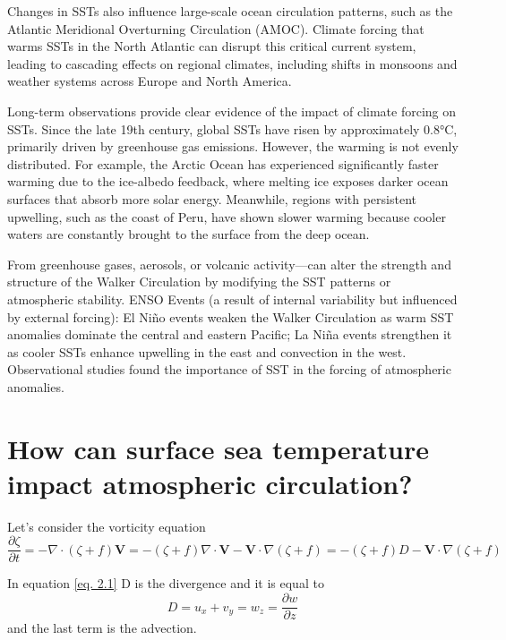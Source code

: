 Changes in SSTs also influence large-scale ocean circulation patterns, such as the Atlantic Meridional Overturning Circulation (AMOC). Climate forcing that warms SSTs in the North Atlantic can disrupt this critical current system, leading to cascading effects on regional climates, including shifts in monsoons and weather systems across Europe and North America.

Long-term observations provide clear evidence of the impact of climate forcing on SSTs. Since the late 19th century, global SSTs have risen by approximately 0.8°C, primarily driven by greenhouse gas emissions. However, the warming is not evenly distributed. For example, the Arctic Ocean has experienced significantly faster warming due to the ice-albedo feedback, where melting ice exposes darker ocean surfaces that absorb more solar energy. Meanwhile, regions with persistent upwelling, such as the coast of Peru, have shown slower warming because cooler waters are constantly brought to the surface from the deep ocean.


From greenhouse gases, aerosols, or volcanic activity—can alter the strength and structure of the Walker Circulation by modifying the SST patterns or atmospheric stability.
ENSO Events (a result of internal variability but influenced by external forcing): El Niño events weaken the Walker Circulation as warm SST anomalies dominate the central and eastern Pacific; La Niña events strengthen it as cooler SSTs enhance upwelling in the east and convection in the west.
Observational studies found the importance of SST in the forcing of atmospheric anomalies.


\section{How can surface sea temperature impact atmospheric circulation?}

Let's consider the vorticity equation
\begin{equation}\label{eq. 2.1}
	\frac{\partial \zeta}{\partial t} = - \nabla \cdot (\zeta + f) \mathbf{V} = - (\zeta + f) \nabla \cdot \mathbf{V} - \mathbf{V} \cdot \nabla (\zeta + f) = - (\zeta + f) D - \mathbf{V} \cdot \nabla (\zeta + f)
\end{equation}

In equation \ref{eq. 2.1} D is the divergence and it is equal to
\begin{equation}
	D=u_x + v_y = w_z = \frac{\partial w}{\partial z}
\end{equation}
and the last term is the advection.


